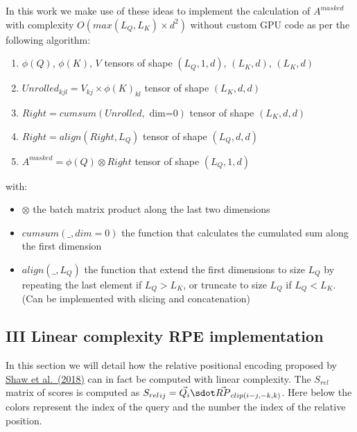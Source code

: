 In this work we make use of these ideas to implement the calculation of
\(A^{masked}\) with complexity \(O(max(L_Q, L_K) \times d^2)\) without
custom GPU code as per the following algorithm:

\begin{enumerate}
\def\labelenumi{\arabic{enumi}.}
\tightlist
\item
  \(\phi(Q)\), \(\phi(K)\), \(V\) tensors of shape \((L_Q, 1, d)\),
  \((L_K, d)\), \((L_K, d)\)
\item
  \(Unrolled_{kjl} = V_{kj} \times \phi(K)_{kl}\) tensor of shape
  \((L_K, d, d)\)
\item
  \(Right = cumsum(Unrolled,\text{ dim=0})\) tensor of shape
  \((L_K, d, d)\)
\item
  \(Right = align(Right, L_Q)\) tensor of shape \((L_Q, d, d)\)
\item
  \(A^{masked} = \phi(Q) \otimes Right\) tensor of shape \((L_Q, 1, d)\)
\end{enumerate}

with:

\begin{itemize}
\tightlist
\item
  \(\otimes\) the batch matrix product along the last two dimensions
\item
  \(cumsum(\_, dim=0)\) the function that calculates the cumulated sum
  along the first dimension
\item
  \(align(\_, L_Q)\) the function that extend the first dimensions to
  size \(L_Q\) by repeating the last element if \(L_Q > L_K\), or
  truncate to size \(L_Q\) if \(L_Q < L_K\). (Can be implemented with
  slicing and concatenation)
\end{itemize}

\hypertarget{iii-linear-complexity-rpe-implementation}{%
\subsection{III Linear complexity RPE
implementation}\label{iii-linear-complexity-rpe-implementation}}

In this section we will detail how the relative positional encoding
proposed by \href{https://arxiv.org/abs/1803.02155}{Shaw et al.~(2018)}
can in fact be computed with linear complexity. The \(S_{rel}\) matrix
of scores is computed as
\({S_{rel}}_{ij} = \vec{Q_i} \sdot \vec{RP}_{clip(i-j, -k, k)}\). Here
below the colors represent the index of the query and the number the
index of the relative position.

